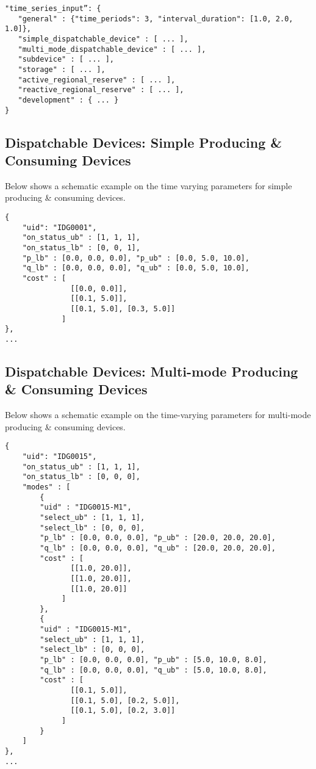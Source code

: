 \begin{verbatim}
"time_series_input”: {
   "general" : {"time_periods": 3, "interval_duration": [1.0, 2.0, 1.0]},
   "simple_dispatchable_device" : [ ... ],
   "multi_mode_dispatchable_device" : [ ... ],
   "subdevice" : [ ... ],
   "storage" : [ ... ],
   "active_regional_reserve" : [ ... ],
   "reactive_regional_reserve" : [ ... ],
   "development" : { ... }
}
\end{verbatim}


\subsection{Dispatchable Devices: Simple Producing \& Consuming Devices}
\label{sec:generator_time}
Below shows a schematic example on the time varying parameters for simple producing \& consuming devices.
\begin{verbatim}
{
    "uid": "IDG0001",
    "on_status_ub" : [1, 1, 1],
    "on_status_lb" : [0, 0, 1],
    "p_lb" : [0.0, 0.0, 0.0], "p_ub" : [0.0, 5.0, 10.0],
    "q_lb" : [0.0, 0.0, 0.0], "q_ub" : [0.0, 5.0, 10.0],
    "cost" : [
               [[0.0, 0.0]],
               [[0.1, 5.0]],
               [[0.1, 5.0], [0.3, 5.0]]
             ]
},
...
\end{verbatim}

\subsection{Dispatchable Devices: Multi-mode Producing \& Consuming Devices}
\label{sec:multi-generator_time}
Below shows a schematic example on the time-varying parameters for multi-mode producing \& consuming devices.
\begin{verbatim}
{
    "uid": "IDG0015",
    "on_status_ub" : [1, 1, 1],
    "on_status_lb" : [0, 0, 0],
    "modes" : [
        {
        "uid" : "IDG0015-M1",
        "select_ub" : [1, 1, 1],
        "select_lb" : [0, 0, 0],
        "p_lb" : [0.0, 0.0, 0.0], "p_ub" : [20.0, 20.0, 20.0],
        "q_lb" : [0.0, 0.0, 0.0], "q_ub" : [20.0, 20.0, 20.0],
        "cost" : [
               [[1.0, 20.0]],
               [[1.0, 20.0]],
               [[1.0, 20.0]]
             ]
        },
        {
        "uid" : "IDG0015-M1",
        "select_ub" : [1, 1, 1],
        "select_lb" : [0, 0, 0],
        "p_lb" : [0.0, 0.0, 0.0], "p_ub" : [5.0, 10.0, 8.0],
        "q_lb" : [0.0, 0.0, 0.0], "q_ub" : [5.0, 10.0, 8.0],
        "cost" : [
               [[0.1, 5.0]],
               [[0.1, 5.0], [0.2, 5.0]],
               [[0.1, 5.0], [0.2, 3.0]]
             ]
        }
    ]
},
...
\end{verbatim}

